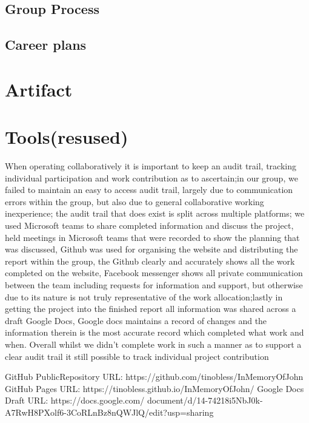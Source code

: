 \documentclass[a4paper,12pt]{extreport}
\begin{document}
	\section{Group Process}
	\section{Career plans}

\chapter*{Artifact}
\lipsum[1]
\chapter*{Tools(resused)}

  When operating collaboratively it is important to keep an audit trail, tracking individual participation and work contribution as to ascertain;in our group, we failed to maintain an easy to access audit trail, largely due to communication errors within the group, but also due to general collaborative working inexperience; the audit trail that does exist is split across multiple platforms; we used Microsoft teams to share completed information and discuss the project, held meetings in Microsoft teams that were recorded to show the planning that was discussed, Github was used for organising the website and distributing the report within the group, the Github clearly and accurately shows all the work completed on the website, Facebook messenger shows all private communication between the team including requests for information and support, but otherwise due to its nature is not truly representative of the work allocation;lastly in getting the project into the finished report all information was shared across a draft Google Docs, Google docs maintains a record of changes and the information therein is the most accurate record which completed what work and when. Overall whilst we didn't complete work in such a manner as to support a clear audit trail it still possible to track individual project contribution\newline


  GitHub PublicRepository URL: https://github.com/tinobless/InMemoryOfJohn\newline
  GitHub Pages URL: https://tinobless.github.io/InMemoryOfJohn/\newline
  Google Docs Draft URL: https://docs.google.com/
  document/d/14-74218i5NbJ0k-A7RwH8PXolf6-3CoRLnBz8nQWJlQ/edit?usp=sharing\newline{}
\end{document}
